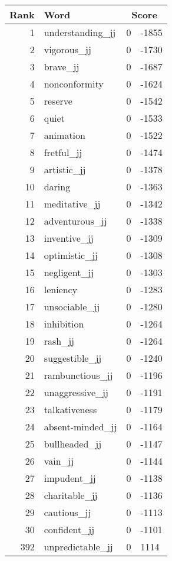 \begin{longtable}[!htbp]{| rlr@{.}l |}
    \hline
    \textbf{Rank} & \textbf{Word} & \multicolumn{2}{c|}{\textbf{Score}} \\
    \hline
    \endhead
    1 & understanding\_jj & 0 & -1855 \\
    2 & vigorous\_jj & 0 & -1730 \\
    3 & brave\_jj & 0 & -1687 \\
    4 & nonconformity & 0 & -1624 \\
    5 & reserve & 0 & -1542 \\
    6 & quiet & 0 & -1533 \\
    7 & animation & 0 & -1522 \\
    8 & fretful\_jj & 0 & -1474 \\
    9 & artistic\_jj & 0 & -1378 \\
    10 & daring & 0 & -1363 \\
    11 & meditative\_jj & 0 & -1342 \\
    12 & adventurous\_jj & 0 & -1338 \\
    13 & inventive\_jj & 0 & -1309 \\
    14 & optimistic\_jj & 0 & -1308 \\
    15 & negligent\_jj & 0 & -1303 \\
    16 & leniency & 0 & -1283 \\
    17 & unsociable\_jj & 0 & -1280 \\
    18 & inhibition & 0 & -1264 \\
    19 & rash\_jj & 0 & -1264 \\
    20 & suggestible\_jj & 0 & -1240 \\
    21 & rambunctious\_jj & 0 & -1196 \\
    22 & unaggressive\_jj & 0 & -1191 \\
    23 & talkativeness & 0 & -1179 \\
    24 & absent-minded\_jj & 0 & -1164 \\
    25 & bullheaded\_jj & 0 & -1147 \\
    26 & vain\_jj & 0 & -1144 \\
    27 & impudent\_jj & 0 & -1138 \\
    28 & charitable\_jj & 0 & -1136 \\
    29 & cautious\_jj & 0 & -1113 \\
    30 & confident\_jj & 0 & -1101 \\
    392 & unpredictable\_jj & 0 & 1114 \\

\end{longtable}
